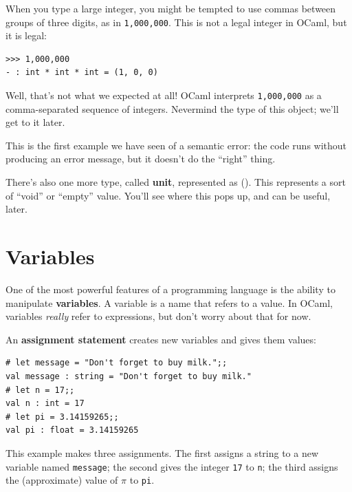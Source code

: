 \documentclass[10pt]{book}
\begin{document}
When you type a large integer, you might be tempted to use commas
between groups of three digits, as in {\tt 1,000,000}.  This is not a
legal integer in OCaml, but it is legal:

\beforeverb
\begin{verbatim}
>>> 1,000,000
- : int * int * int = (1, 0, 0)
\end{verbatim}
\afterverb

Well, that's not what we expected at all!  OCaml interprets {\tt  1,000,000} 
as a comma-separated sequence of integers. Nevermind the type of this object; 
we'll get to it later.


This is the first example we have seen of a semantic error: the code
runs without producing an error message, but it doesn't do the
``right'' thing.

There's also one more type, called {\bf unit}, represented as (). This represents 
a sort of ``void''  or ``empty'' value. You'll see where this pops up, and can be useful, later.


\section{Variables}

One of the most powerful features of a programming language is the
ability to manipulate {\bf variables}.  A variable is a name that
refers to a value. In OCaml, variables {\it really} refer to expressions, 
but don't worry about that for now.

An {\bf assignment statement} creates new variables and gives
them values:

\beforeverb
\begin{verbatim}
# let message = "Don't forget to buy milk.";;
val message : string = "Don't forget to buy milk."
# let n = 17;;
val n : int = 17
# let pi = 3.14159265;;
val pi : float = 3.14159265
\end{verbatim}
\afterverb

This example makes three assignments.  The first assigns a string
to a new variable named {\tt message};
the second gives the integer {\tt 17} to {\tt n}; the third
assigns the (approximate) value of $\pi$ to {\tt pi}.

\end{document}
